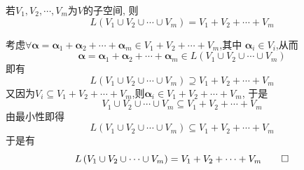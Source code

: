 \begin{green}
\begin{corollary}[并集张成的空间]\label{cor:并集张成的空间}
    若$V_1,V_2,\cdots,V_m$为$V$的子空间,
    则
    \[
    L\left(
        V_1 \cup V_2\cup \cdots \cup
        V_m 
    \right)=
    V_1 +V_2+\cdots
    + V_m
    \]
\end{corollary}
\begin{Proof}
考虑$\forall \bm{\alpha}=\bm{\alpha}_1+\bm{\alpha}_2+
\cdots+\bm{\alpha}_m\in V_1+V_2+\cdots+V_m$,其中
$\bm{\alpha}_i\in V_i$,从而
\[
\bm{\alpha}=\bm{\alpha}_1+\bm{\alpha}_2+
\cdots+\bm{\alpha}_m\in L\left(
    V_1 \cup V_2\cup \cdots \cup
        V_m 
\right)
\]
即有
\[
    L\left(
        V_1 \cup V_2\cup \cdots \cup
        V_m 
    \right)\supseteq
    V_1 +V_2+\cdots
    + V_m
    \]
又因为$V_i\subseteq V_1 + V_2+ \cdots +
        V_m $,则$\bm{\alpha}_i\in V_1+V_2+\cdots+V_m$,
于是
\[
V_1\cup V_2\cup \cdots\cup V_m\subseteq V_1+V_2+\cdots+V_m
\]
由最小性即得
\[
    L\left(
        V_1 \cup V_2\cup \cdots \cup
        V_m 
    \right)\subseteq
    V_1 +V_2+\cdots
    + V_m
    \]
于是有\[
    L\left(
        V_1 \cup V_2\cup \cdots \cup
        V_m 
    \right)=
    V_1 +V_2+\cdots
    + V_m
\qedhere
    \]
    \end{Proof}
\end{green}
